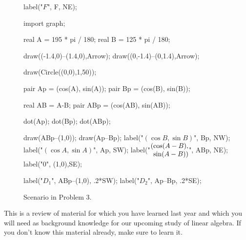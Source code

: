 \documentclass[../gatm.tex]{subfiles}
\begin{document}
\begin{figure}[h]
\begin{minipage}{0.45\textwidth}
\begin{center}
\begin{asy}[width=\textwidth]
				label("$F$", F, NE);
				
			\end{asy}
			\caption{Scenario in Problem 2.}
			\label{fig:pythag_sim_tri}
		\end{center}
	\end{minipage}
	\centering
	\begin{center}
		\begin{asy}[width=\textwidth]
			import graph;
			
			real A = 195 * pi / 180;
			real B = 125 * pi / 180;
			
			draw((-1.4,0)--(1.4,0),Arrow);
			draw((0,-1.4)--(0,1.4),Arrow);
			
			draw(Circle((0,0),1,50));
			
			pair Ap = (cos(A), sin(A));
			pair Bp = (cos(B), sin(B));
			
			real AB = A-B;
			pair ABp = (cos(AB), sin(AB));
			
			dot(Ap);
			dot(Bp);
			dot(ABp);
			
			draw(ABp--(1,0));
			draw(Ap--Bp);
			label("$(\cos B, \sin B)$", Bp, NW);
			label("$(\cos A, \sin A)$", Ap, SW);
			label("$\arraycolsep=0pt \begin{array}{rl} (& \cos (A-B), \\ & \sin (A-B)) \end{array}$", ABp, NE);
			label("$0$", (1,0),SE);
			
			label("$D_1$", ABp--(1,0), .2*SW);
			label("$D_2$", Ap--Bp, .2*SE);
			
		\end{asy}
		\caption{Scenario in Problem 3.}
		\label{fig:unit_circle}
	\end{center}
\end{figure}

\noindent This is a review of material for which you have learned last year and which you will need as background knowledge for our upcoming study of linear algebra. If you don't know this material already, make sure to learn it.
\end{document}
